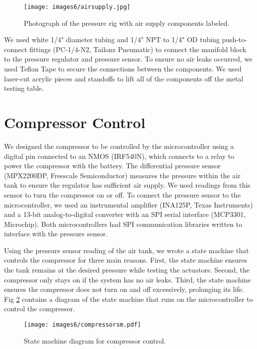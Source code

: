 \begin{figure}[!ht]
    \centering
    \texttt{[image: images6/airsupply.jpg]}
    \caption{Photograph of the pressure rig with air supply components labeled.}
    \label{fig:airsupply}
\end{figure}

We used white 1/4" diameter tubing and 1/4" NPT to 1/4" OD tubing push-to-connect fittings (PC-1/4-N2, Tailonz Pneumatic) to connect the manifold block to the pressure regulator and pressure sensor. To ensure no air leaks occurred, we used Teflon Tape to secure the connections between the components. We used laser-cut acrylic pieces and standoffs to lift all of the components off the metal testing table. 

\section{Compressor Control}

We designed the compressor to be controlled by the microcontroller using a digital pin connected to an NMOS (IRF540N), which connects to a relay to power the compressor with the battery. The differential pressure sensor (MPX2200DP, Freescale Semiconductor) measures the pressure within the air tank to ensure the regulator has sufficient air supply. We used readings from this sensor to turn the compressor on or off. To connect the pressure sensor to the microcontroller, we used an instrumental amplifier (INA125P, Texas Instruments) and a 13-bit analog-to-digital converter with an SPI serial interface (MCP3301, Microchip). Both microcontrollers had SPI communication libraries written to interface with the pressure sensor. 

Using the pressure sensor reading of the air tank, we wrote a state machine that controls the compressor for three main reasons. First, the state machine ensures the tank remains at the desired pressure while testing the actuators. Second, the compressor only stays on if the system has no air leaks. Third, the state machine ensures the compressor does not turn on and off excessively, prolonging its life. Fig \ref{fig:compressorsm} contains a diagram of the state machine that runs on the microcontroller to control the compressor. 

\begin{figure}[ht]
    \centering
    \texttt{[image: images6/compressorsm.pdf]}
    \caption{State machine diagram for compressor control.}
    \label{fig:compressorsm}
\end{figure}

